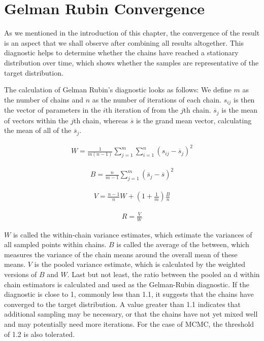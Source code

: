 \section{Gelman Rubin Convergence}
As we mentioned in the introduction of this chapter, the convergence of the result is an aspect that we shall observe after combining all results altogether. This diagnostic helps to determine whether the chains have reached a stationary distribution over time, which shows whether the samples are representative of the target distribution.\cite{gelman_rubin}

The calculation of Gelman Rubin's diagnostic looks as follows: We define $m$ as the number of chains and $n$ as the number of iterations of each chain. $s_{ij}$ is then the vector of parameters in the $i$th iteration of from the $j$th chain. $\overline{s}_j$ is the mean of vectors within the $j$th chain, whereas $\overline{s}$ is the grand mean vector, calculating the mean of all of the $\overline{s}_j$.\cite{gr_calc}

\begin{align}
W = \frac 1 {m(n-1)}\sum_{j=1}^m \sum_{i=1}^n (s_{ij} - \overline{s}_j)^2
\end{align}

\begin{align}
B = \frac n {m-1} \sum_{j=1}^m (\overline{s}_j - \overline{s})^2
\end{align}

\begin{align}
V = \frac {n-1}n W + (1 + \frac 1 m)\frac B n
\end{align}

\begin{align}
R = \frac V W
\end{align}

$W$ is called the within-chain variance estimates, which estimate the variances of all sampled points within chains. $B$ is called the average of the between, which measures the variance of the chain means around the overall mean of these means. $V$ is the pooled variance estimate, which is calculated by the weighted versions of $B$ and $W$. Last but not least, the ratio between the pooled an d within chain estimators is calculated and used as the Gelman-Rubin diagnostic. If the diagnostic is close to 1, commonly less than 1.1, it suggests that the chains have converged to the target distribution. A value greater than 1.1 indicates that additional sampling may be necessary, or that the chains have not yet mixed well and may potentially need more iterations.\cite{gr_calc} For the case of MCMC, the threshold of 1.2 is also tolerated.\cite{gr1.2}

